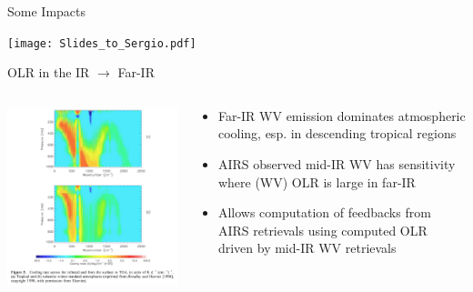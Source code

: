 \documentclass[10pt,t]{beamer}
\begin{document}
\begin{frame}{Some Impacts}
\vspace{-0.35in}
\begin{center}
\texttt{[image: Slides\_to\_Sergio.pdf]}
\end{center}
\end{frame}
\begin{frame}{OLR in the IR $\rightarrow$ Far-IR}
\begin{block}{}

\vspace{-0.1in}
\begin{columns}

\begin{column}{0.55\columnwidth}
\begin{block}{}
\vspace{-0.1in}
\begin{center}
\includegraphics[width=\linewidth]{NEWFIGS/image_spectralOLR.png}
\end{center}
\end{block}
\end{column}

\begin{column}{0.55\columnwidth}
\begin{block}{}
\begin{itemize}
\item Far-IR WV emission dominates atmospheric cooling, esp. in descending tropical regions
\item AIRS observed mid-IR WV has sensitivity where (WV) OLR is large in far-IR
\item Allows computation of feedbacks from AIRS retrievals using computed OLR driven by mid-IR WV retrievals
\end{itemize}
\end{block}
\end{column}


\end{columns}
\end{block}
\end{frame}
\end{document}
